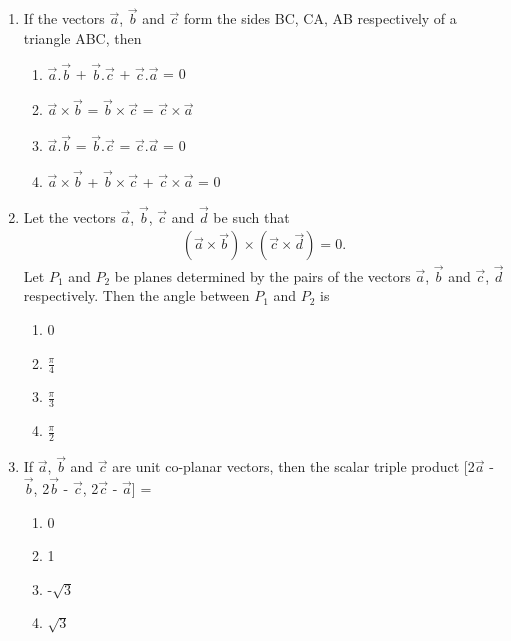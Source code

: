 \begin{enumerate}[label=\arabic*.,ref=\thesubsection.\theenumi]
\item If the vectors $\overrightarrow{a}$, $\overrightarrow{b}$ and $\overrightarrow{c}$ form the sides BC, CA, AB respectively of a triangle ABC, then
\begin{enumerate}
\item $\overrightarrow{a} . \overrightarrow{b}$ + $\overrightarrow{b} . \overrightarrow{c}$ + $\overrightarrow{c} . \overrightarrow{a}$ = 0
\item $\overrightarrow{a} \times \overrightarrow{b}$ = $\overrightarrow{b} \times \overrightarrow{c}$ = $\overrightarrow{c} \times \overrightarrow{a}$
\item $\overrightarrow{a} . \overrightarrow{b}$ = $\overrightarrow{b} . \overrightarrow{c}$ = $\overrightarrow{c} . \overrightarrow{a}$ = 0
\item $\overrightarrow{a} \times \overrightarrow{b}$ + $\overrightarrow{b} \times \overrightarrow{c}$ + $\overrightarrow{c} \times \overrightarrow{a}$ = 0
\end{enumerate}

\item Let the vectors $\overrightarrow{a}$, $\overrightarrow{b}$, $\overrightarrow{c}$ and 
$\overrightarrow{d}$ be such that 
\begin{align*}
(\overrightarrow{a} \times \overrightarrow{b}) \times (\overrightarrow{c} \times \overrightarrow{d}) = 0.
\end{align*}
Let $P_1$ and $P_2$ be planes determined by the pairs of the vectors $\overrightarrow{a}$, $\overrightarrow{b}$ and $\overrightarrow{c}$, $\overrightarrow{d}$ respectively. Then the angle between $P_1$ and $P_2$ is
\begin{enumerate}
\item 0
\item $\frac{\pi}{4}$
\item $\frac{\pi}{3}$
\item $\frac{\pi}{2}$
\end{enumerate}

\item If $\overrightarrow{a}$, $\overrightarrow{b}$ and $\overrightarrow{c}$ are unit co-planar vectors, then the scalar triple product [2$\overrightarrow{a}$ - $\overrightarrow{b}$, 2$\overrightarrow{b}$ - $\overrightarrow{c}$, 2$\overrightarrow{c}$ - $\overrightarrow{a}$] = 
\begin{enumerate}
\item 0
\item 1
\item -$\sqrt{3}$
\item $\sqrt{3}$
\end{enumerate}


\end{enumerate}
